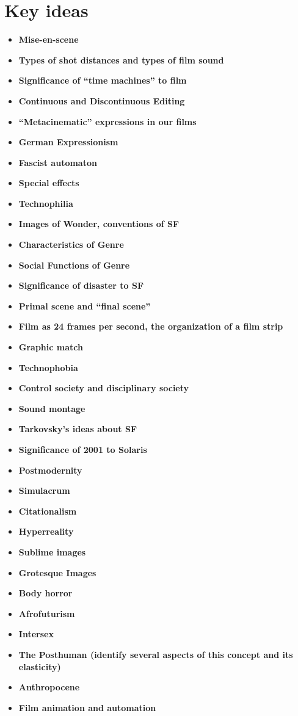 \documentclass[11pt,fleqn]{book}
\begin{document}
\section{Key ideas}
\begin{itemize}
\item \textbf{Mise-en-scene}
\item \textbf{Types of shot distances and types of film sound}
\item \textbf{Significance of “time machines” to film}
\item \textbf{Continuous and Discontinuous Editing}
\item \textbf{“Metacinematic” expressions in our films}
\item \textbf{German Expressionism}
\item \textbf{Fascist automaton}
\item \textbf{Special effects}
\item \textbf{Technophilia}
\item \textbf{Images of Wonder, conventions of SF}
\item \textbf{Characteristics of Genre}
\item \textbf{Social Functions of Genre}
\item \textbf{Significance of disaster to SF}
\item \textbf{Primal scene and “final scene”}
\item \textbf{Film as 24 frames per second, the organization of a film strip}
\item \textbf{Graphic match}
\item \textbf{Technophobia}
\item \textbf{Control society and disciplinary society}
\item \textbf{Sound montage} 
\item \textbf{Tarkovsky’s ideas about SF}
\item \textbf{Significance of 2001 to Solaris}
\item \textbf{Postmodernity}
\item \textbf{Simulacrum}
\item \textbf{Citationalism}
\item \textbf{Hyperreality}
\item \textbf{Sublime images}
\item \textbf{Grotesque Images}
\item \textbf{Body horror}
\item \textbf{Afrofuturism}
\item \textbf{Intersex}
\item \textbf{The Posthuman (identify several aspects of this concept and its elasticity)}
\item \textbf{Anthropocene}
\item \textbf{Film animation and automation}
\end{itemize}
\end{document}
